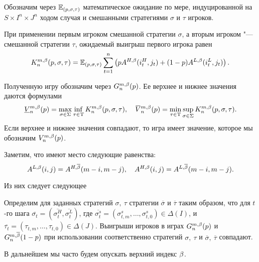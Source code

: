 Обозначим через $\operatorname{\mathbb{E}}_{(p,\sigma,\tau)}$ математическое ожидание по мере, индуцированной на $S \times I^n \times J^n$ ходом случая и смешанными стратегиями $\sigma$ и $\tau$ игроков.

При применении первым игроком смешанной стратегии $\sigma$, а вторым игроком "--- смешанной стратегии $\tau$, ожидаемый выигрыш первого игрока равен
\begin{equation*}
  K^{m,\beta}_n(p, \sigma, \tau) = \operatorname{\mathbb{E}}_{(p,\sigma,\tau)} \sum_{t=1}^n
  \left(
    pA^{H,\beta}(i_t^H, j_t) + (1 - p)A^{L,\beta}(i_t^L, j_t)
  \right).
\end{equation*}

Полученную игру обозначим через $G^{m,\beta}_n(p)$.
Ее верхнее и нижнее значения даются формулами
\begin{equation*}
  \underline{V}^{m,\Co}_n(p) = \max_{\sigma \in \Sigma} \inf_{\tau \in \Tau}
  K^{m,\Co}_n(p, \sigma, \tau), \quad
  \overbar{V}^{m,\Co}_n(p) = \min_{\tau \in \Tau} \sup_{\sigma \in \Sigma}
  K^{m,\Co}_n(p, \sigma, \tau).
\end{equation*}
Если верхнее и нижнее значения совпадают, то игра имеет значение, которое мы обозначим $V^{m,\beta}_n(p)$.

Заметим, что имеют место следующие равенства:
\begin{equation*}
  A^{L,\beta}(i, j) = A^{H,{\overline{\beta}}}(m-i, m-j), \quad
  A^{H,\beta}(i, j) = A^{L,{\overline{\beta}}}(m-i, m-j).
\end{equation*}

Из них следует следующее
\begin{remark}
  \label{ch1:rem:symm-payoffs}
  Определим для заданных стратегий $\sigma,\ \tau$ стратегии $\overbar{\sigma}$ и $\overbar{\tau}$ таким образом, что для $t$-го шага
  $\overbar{\sigma_t} = (\overbar{\sigma^H_t}, \overbar{\sigma^L_t})$, где
  $\overbar{\sigma^s_t}=(\sigma^s_{t,m},\ldots,\sigma^s_{t,0}) \in \Delta(I)$, и
  $\overbar{\tau_t} = (\tau_{t,m},\ldots,\tau_{t,0}) \in \Delta(J)$.
  Выигрыши игроков в играх $G^{m, \beta}_n(p)$ и $G^{m, {\overline{\beta}}}_n(1-p)$ при использовании соответственно стратегий $\sigma,\ \tau$ и $\overbar{\sigma},\ \overbar{\tau}$ совпадают.
\end{remark}

В дальнейшем мы часто будем опускать верхний индекс $\beta$.

